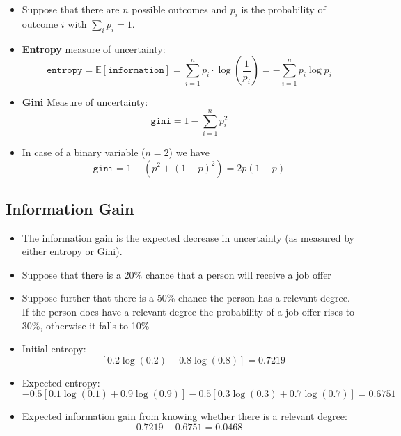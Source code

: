 \begin{itemize}
    \item Suppose that there are $n$ possible outcomes and $p_{i}$ is the probability of outcome $i$ with $\sum _{i} p_{i} =1$.
    \item \textbf{Entropy} measure of uncertainty:
          \begin{equation*}
              \texttt{entropy} =\mathbb{E}\left[\texttt{information}\right] =\sum _{i=1}^{n} p_{i} \cdot \log\left(\frac{1}{p_{i}}\right) =-\sum _{i=1}^{n} p_{i}\log p_{i}
          \end{equation*}
    \item \textbf{Gini} Measure of uncertainty:
          \begin{equation*}
              \texttt{gini} = 1 - \sum_{i=1}^{n} p_{i}^{2}
          \end{equation*}
    \item In case of a binary variable ($n=2$) we have
          \begin{equation*}
              \texttt{gini} = 1 - (p^{2} + (1-p)^{2}) = 2p(1-p)
          \end{equation*}
\end{itemize}

\subsection{Information Gain}

\begin{itemize}
    \item The information gain is the expected decrease in uncertainty (as measured by either entropy or Gini).
    \item Suppose that there is a 20\% chance that a person will receive a job offer
    \item Suppose further that there is a 50\% chance the person has a relevant degree. If the person does have a relevant degree the probability of a job offer rises to 30\%, otherwise it falls to 10\%
    \item Initial entropy:
          \begin{equation*}
              -[ 0.2\log(0.2) +0.8\log(0.8)] =0.7219
          \end{equation*}
    \item Expected entropy:
          \begin{equation*}
              -0.5\left[ 0.1\log\left(0.1\right) +0.9\log\left(0.9\right)\right] -0.5\left[ 0.3\log\left(0.3\right) +0.7\log\left(0.7\right)\right] = 0.6751
          \end{equation*}
    \item Expected information gain from knowing whether there is a relevant degree:
          \begin{equation*}
              0.7219-0.6751=0.0468
          \end{equation*}
\end{itemize}

